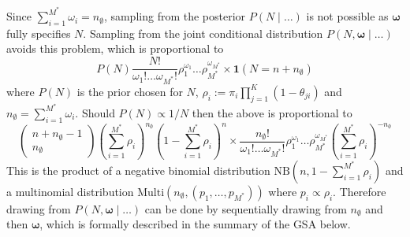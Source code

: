 \documentclass[10pt,a4paper,notitlepage]{article}
\begin{document}
Since $\sum_{i=1}^{M^{*}}\omega_{i}=n_{\emptyset}$, sampling from the posterior $P(N\mid\hdots)$ is not possible as $\bm{\omega}$ fully specifies $N$. Sampling from the joint conditional distribution $P(N,\bm{\omega}\mid\hdots)$ avoids this problem, which is proportional to 
\begin{equation}
P(N)\frac{N!}{\omega_{1}!\hdots\omega_{M^{*}}!}\rho_{1}^{\omega_{1}}\hdots\rho_{M^{*}}^{\omega_{M^{*}}}\times \mathbf{1}(N=n+n_{\emptyset})
\end{equation}
where $P(N)$ is the prior chosen for $N$, $\rho_{i}:=\pi_{i}\prod_{j=1}^{K}(1-\theta_{ji})$ and $n_{\emptyset}=\sum_{i=1}^{M^{*}}\omega_{i}$. Should $P(N)\propto1/N$ then the above is proportional to
\begin{equation}
\begin{pmatrix} n+n_{\emptyset}-1\\n_{\emptyset}\end{pmatrix} \left(\sum_{i=1}^{M^{*}}\rho_{i}\right)^{n_{\emptyset}}\left(1-\sum_{i=1}^{M^{*}}\rho_{i}\right)^{n}\times \frac{n_{\emptyset}!}{\omega_{1}!\hdots\omega_{M^{*}}!}\rho_{1}^{\omega_{1}}\hdots\rho_{M^{*}}^{\omega_{M^{*}}}\left(\sum_{i=1}^{M^{*}}\rho_{i}\right)^{-n_{\emptyset}}
\end{equation}
This is the product of a negative binomial distribution $\text{NB}(n,1-\sum_{i=1}^{M^{*}}\rho_{i})$ and a multinomial distribution $\text{Multi}(n_{\emptyset},(p_{1},\hdots,p_{M^{*}}))$ where $p_{i}\propto\rho_{i}$. Therefore drawing from $P(N,\bm{\omega}\mid\hdots)$ can be done by sequentially drawing from $n_{\emptyset}$ and then $\bm{\omega}$,  which is formally described in the summary of the GSA below.
\end{document}
